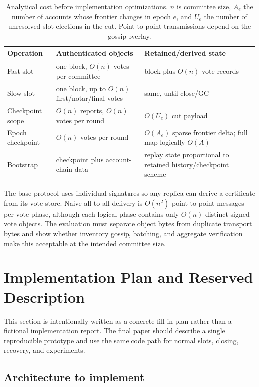 \documentclass[sigplan,review,anonymous]{acmart}
\begin{document}
\begin{table}[t]
\caption{Analytical cost before implementation optimizations.  $n$ is committee size, $A_e$ the number of accounts whose frontier changes in epoch $e$, and $U_e$ the number of unresolved slot elections in the cut.  Point-to-point transmissions depend on the gossip overlay.}
\label{tab:cost}
\centering
\small
\begin{tabularx}{\columnwidth}{@{}lXX@{}}
\toprule
Operation & Authenticated objects & Retained/derived state \\
\midrule
Fast slot & one block, $O(n)$ votes per committee & block plus $O(n)$ vote records \\
Slow slot & one block, up to $O(n)$ first/notar/final votes & same, until close/GC \\
Checkpoint scope & $O(n)$ reports, $O(n)$ votes per round & $O(U_e)$ cut payload \\
Epoch checkpoint & $O(n)$ votes per round & $O(A_e)$ sparse frontier delta; full map logically $O(A)$ \\
Bootstrap & checkpoint plus account-chain data & replay state proportional to retained history/checkpoint scheme \\
\bottomrule
\end{tabularx}
\end{table}

The base protocol uses individual signatures so any replica can derive a certificate from its vote store.  Naive all-to-all delivery is $O(n^2)$ point-to-point messages per vote phase, although each logical phase contains only $O(n)$ distinct signed vote objects.  The evaluation must separate object bytes from duplicate transport bytes and show whether inventory gossip, batching, and aggregate verification make this acceptable at the intended committee size.

\section{Implementation Plan and Reserved Description}
\label{sec:impl}

This section is intentionally written as a concrete fill-in plan rather than a fictional implementation report.  The final paper should describe a single reproducible prototype and use the same code path for normal slots, closing, recovery, and experiments.

\subsection{Architecture to implement}
\end{document}
